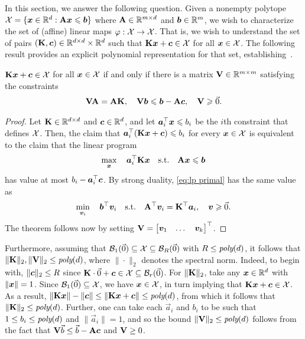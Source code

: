 In this section, we answer the following question. Given a nonempty polytope ${\mathcal{X}} = \{ {\bm{x}} \in \mathbb R^d : {\mathbf{A}} {\bm{x}} \leqslant {\bm{b}}\}$ where ${\mathbf{A}}\in\mathbb R^{m\times d}$ and ${\bm{b}}\in\mathbb R^m$, we wish to characterize the set of (affine) linear maps $\varphi : {\mathcal{X}} \to {\mathcal{X}}$. That is, we wish to understand the set of pairs $({\mathbf{K}}, {\bm{c}}) \in \mathbb R^{d\times d} \times \mathbb R^d$ such that ${\mathbf{K}} {\bm{x}} + {\bm{c}}\in {\mathcal{X}}$ for all ${\bm{x}}\in{\mathcal{X}}$. The following result provides an explicit polynomial representation for that set, establishing~.

\begin{theorem}
    \label{theorem:explicit-repres}
    ${\mathbf{K}} {\bm{x}} + {\bm{c}} \in {\mathcal{X}}$ for all ${\bm{x}}\in{\mathcal{X}}$ if and only if there is a matrix ${\mathbf{V}} \in \mathbb R^{m \times m}$ satisfying the constraints
    \begin{align}
        {\mathbf{V}}{\mathbf{A}} = {\mathbf{A}}{\mathbf{K}}, \quad {\mathbf{V}}{\bm{b}} \leqslant {\bm{b}} - {\mathbf{A}} {\bm{c}}, \quad {\mathbf{V}} \geqslant \vec 0.
    \end{align}
\end{theorem}
\begin{proof}
    Let ${\mathbf{K}} \in \mathbb R^{d\times d}$ and ${\bm{c}} \in \mathbb R^d$, and let ${\bm{a}}_i^\top  {\bm{x}} \leqslant b_i$ be the $i$th constraint that defines ${\mathcal{X}}$. Then, the claim that ${\bm{a}}_i^\top ({\mathbf{K}} {\bm{x}} + {\bm{c}}) \leqslant b_i$ for every ${\bm{x}}\in{\mathcal{X}}$ is equivalent to the claim that the linear program
    \begin{align}
        \max_{\vx} \quad \va_i^\top \mK \vx \qq{s.t.} \mA\vx\le \vb\label{eq:lp primal}
    \end{align}
    has value at most $b_i - {\bm{a}}_i^\top {\bm{c}}$. By strong duality, \eqref{eq:lp primal} has the same value as
    \begin{align*}
        \min_{\vv_i} \quad \vb^\top\vv_i \qq{s.t.} \mA^\top \vv_i = \mK^\top \va_i, \quad \vv \ge \vec 0.
    \end{align*}
    The theorem follows now by setting $\mV = \mqty[\vv_1 & \dots & \vv_k]^\top$.
\end{proof}

Furthermore, assuming that ${\mathcal{B}}_1(\vec{0}) \subseteq {\mathcal{X}} \subseteq {\mathcal{B}}_R(\vec{0})$ with $R \leq \textit{poly}(d)$, it follows that $\| \mathbf{K} \|_2, \|\mathbf{V} \|_2 \leq \textit{poly}(d)$, where $\|\cdot\|_2$ denotes the spectral norm. Indeed, to begin with, $\| {\bm{c}} \|_2 \leq R$ since ${\mathbf{K}} \cdot \vec{0} + {\bm{c}} \in {\mathcal{X}} \subseteq {\mathcal{B}}_r(\vec{0})$. For $\| \mathbf{K} \|_2$, take any ${\bm{x}} \in \mathbb R^d$ with $\|{\bm{x}}\| = 1$. Since ${\mathcal{B}}_1(\vec{0}) \subseteq {\mathcal{X}}$, we have ${\bm{x}} \in {\mathcal{X}}$, in turn implying that $\mathbf{K} {\bm{x}} + {\bm{c}} \in {\mathcal{X}}$. As a result, $\|\mathbf{K} {\bm{x}} \| - \|{\bm{c}}\| \leq \| \mathbf{K} {\bm{x}} + {\bm{c}} \| \leq \textit{poly}(d)$, from which it follows that $\| \mathbf{K} \|_2 \leq \textit{poly}(d)$. Further, one can take each $\vec{a}_i$ and $b_i$ to be such that $1 \leq b_i \leq \textit{poly}(d)$ and $\| \vec{a}_i \| = 1$, and so the bound $\| \mathbf{V} \|_2 \leq \textit{poly}(d)$ follows from the fact that $\mathbf{V} \vec{b} \leq \vec{b} - \mathbf{A} {\bm{c}}$ and $\mathbf{V} \geq 0$.

